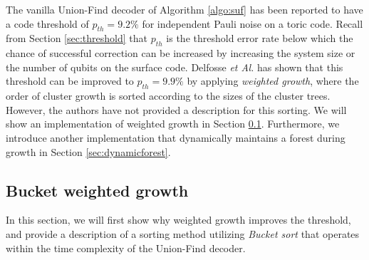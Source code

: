 The vanilla Union-Find decoder of Algorithm \ref{algo:suf} has been reported to have a code threshold of $p_{th}=9.2\%$ for independent Pauli noise \cite{delfosse2017almost} on a toric code. Recall from Section \ref{sec:threshold} that $p_{th}$ is the threshold error rate below which the chance of successful correction can be increased by increasing the system size or the number of qubits on the surface code. Delfosse \emph{et Al.} has shown that this threshold can be improved to $p_{th}=9.9\%$ by applying \emph{weighted growth}, where the order of cluster growth is sorted according to the sizes of the cluster trees. However, the authors have not provided a description for this sorting. We will show an implementation of weighted growth in Section \ref{sec:bucketwg}. Furthermore, we introduce another implementation that dynamically maintains a forest during growth in Section \ref{sec:dynamicforest}.

\subsection{Bucket weighted growth}\label{sec:bucketwg}
In this section, we will first show why weighted growth improves the threshold, and provide a description of a sorting method utilizing \emph{Bucket sort} that operates within the time complexity of the Union-Find decoder. 



